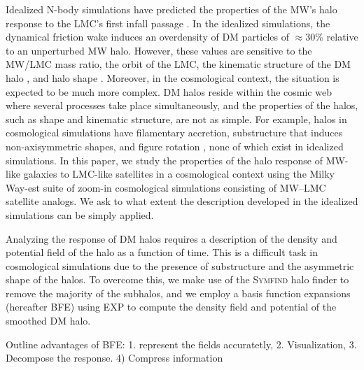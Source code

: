 \documentclass[twocolumn, linenumbers]{openjournal}
\newcommand{\expcode}{\textsc{EXP }}
\begin{document}
Idealized N-body simulations have predicted the properties of the MW's halo response to the 
LMC's first infall passage \citep{Mastropietro05, Gomez15, laporte17, Petersen_20, Garavito_Camargo_2021, 
Vasiliev_21, Lilleengen_23, vasiliev2023dear, Sheng_24}. 
In the idealized simulations, the dynamical friction wake induces an overdensity of 
DM particles of $\approx$30\%  relative to an unperturbed MW halo.  However, these values 
are sensitive to the MW/LMC mass ratio, the orbit of the LMC, the kinematic structure of the 
DM halo \citep{Garavito_Camargo_2021, Simon_22, Vasiliev_23review, Sheng_24}, and halo shape
\citep{Sheng_24}. Moreover, in the cosmological context, the situation is expected to be much 
more complex. DM halos reside within the cosmic web where several processes take place 
simultaneously, and the properties of the halos, such as shape and kinematic structure, are not
as simple. For example, halos in cosmological simulations have filamentary accretion, substructure
that induces non-axisymmetric shapes, and figure rotation \citep{Valluri_21, Ash23}, none of which
exist in idealized simulations. In this paper, we study the properties of the halo response of
MW-like galaxies to LMC-like satellites in a cosmological context using the Milky Way-est suite
of zoom-in cosmological simulations consisting of MW--LMC satellite analogs. We ask to what
extent the description developed in the idealized simulations can be simply applied.

Analyzing the response of DM halos requires a description of the density and potential field of 
the halo as a function of time. This is a difficult task in cosmological simulations due to the 
presence of substructure and the asymmetric shape of the halos. To overcome this, we make use of 
the \textsc{Symfind} halo finder \citep{mansfield2023symfind} to remove the majority of the subhalos, 
and we employ a basis function expansions (hereafter BFE) using \expcode \citep{EXP} to compute the density 
field and potential of the smoothed DM halo.  

{\color{DarkSeaGreen4} Outline advantages of BFE: 1. represent the fields accuratetly, 2. Visualization, 
3. Decompose the response. 4) Compress information}
\end{document}
